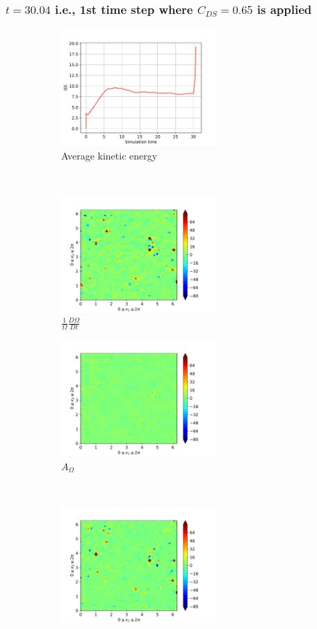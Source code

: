 \subsubsection{$t=30.04$ i.e., 1st time step where $C_{DS}=0.65$ is applied} 
\begin{figure}[H]
    \begin{subfigure}[H]{0.45\textwidth}
        \includegraphics[height=1.75in]{media/run-cds-65/enst-average1380}
        \caption{Average kinetic energy}
    \end{subfigure}
    ~
    \begin{subfigure}[H]{0.45\textwidth}
        \includegraphics[height=1.75in]{media/run-cds-65/enst-1380}
        \caption{$\frac{1}{\Omega} \frac{D \Omega}{Dt}$}
    \end{subfigure}
    \newline
    \begin{subfigure}{0.45\textwidth}
        \includegraphics[height=1.75in]{media/run-cds-65/A-enst-1380}
        \caption{$A_{\Omega}$}
    \end{subfigure}
    ~
    \begin{subfigure}{0.45\textwidth}
        \includegraphics[height=1.75in]{media/run-cds-65/Pi-enst-1380}

\end{subfigure}
\end{figure}
